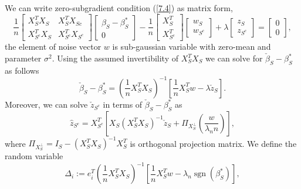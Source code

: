 \documentclass[12pt]{article}
\numberwithin{equation}{section}
\begin{document}
We can write zero-subgradient condition (\ref{7.4}) as matrix form,
\begin{equation}
\frac{1}{n}\left[\begin{array}{cc}{X_{S}^{T} X_{S}} & {X_{S}^{T} X_{S c}} \\ {X_{S^{c}}^{T} X_{S}} & {X_{S^{c}}^{T} X_{S^{c}}}\end{array}\right]\left[\begin{array}{c}{\beta_{S}-\beta_{S}^{*}} \\ {0}\end{array}\right]-\frac{1}{n}\left[\begin{array}{l}{X_{S}^{T}} \\ {X_{S^{c}}^{T}}\end{array}\right]\left[\begin{array}{c}{w_{S}} \\ {w_{S^{c}}}\end{array}\right]+\lambda\left[\begin{array}{c}{z_{S}} \\ {z_{S^{c}}}\end{array}\right]=\left[\begin{array}{l}{0} \\ {0}\end{array}\right],
\end{equation}
the element of noise vector $w$ is sub-gaussian variable with zero-mean and parameter $\sigma^2$. Using the assumed invertibility of $X_{S}^{T} X_{S}$ we can solve for $\check{\beta}_{S}-\beta_{S}^{*}$ as follows
\begin{equation}
\check{\beta}_{S}-\beta_{S}^{*}=\left(\frac{1}{n} X_{S}^{T} X_{S}\right)^{-1}\left[\frac{1}{n} X_{S}^{T} w-\lambda \check{z}_{S}\right].
\end{equation}
Moreover, we can solve $\check{z}_{S^c}$ in terms of $\check{\beta}_{S}-\beta_{S}^{*}$ as
\begin{equation}\label{7.8}
\hat{z}_{S^{c}}=X_{S^{c}}^{T}\left[X_{S}\left(X_{S}^{T} X_{S}\right)^{-1} \check{z}_{S}+\Pi_{X_{S}^{\perp}}\left(\frac{w}{\lambda_{n} n}\right)\right],
\end{equation}
where $\Pi_{X_{S}^{\perp}}=I_S-\left(X_{S}^{T} X_{S}\right)^{-1}X_S^T$ is orthogonal projection matrix. We define the random variable 
\begin{equation}\label{7.9}
\Delta_{i}:=e_{i}^{T}\left(\frac{1}{n} X_{S}^{T} X_{S}\right)^{-1}\left[\frac{1}{n} X_{S}^{T} w-\lambda_{n} \operatorname{sgn}\left(\beta_{S}^{*}\right)\right],
\end{equation}
\end{document}
